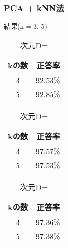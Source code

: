 \documentclass[dvipdfmx]{beamer}
\begin{document}
\begin{frame}
  \frametitle{PCA + kNN法}
  結果(k = 3, 5)
  \begin{table}
    \centering
    \begin{minipage}{0.3\columnwidth}
      \caption{次元D= }
      \centering
      \begin{tabular}{c r } \toprule
      kの数 & 正答率  \\ \midrule
      3 & 92.53\% \\
      5 & 92.85\% \\ \bottomrule
      \end{tabular}
    \end{minipage}
    \begin{minipage}{0.3\columnwidth}
      \caption{次元D= }
      \centering
      \begin{tabular}{c r } \toprule
      kの数 & 正答率  \\ \midrule
      3 & 97.57\% \\
      5 & 97.53\% \\ \bottomrule
      \end{tabular}
    \end{minipage}
    \begin{minipage}{0.3\columnwidth}
      \caption{次元D= }
      \centering
      \begin{tabular}{c r } \toprule
      kの数 & 正答率  \\ \midrule
      3 & 97.36\% \\
      5 & 97.38\% \\ \bottomrule
      \end{tabular}
    \end{minipage}
  \end{table}

\end{frame}
\end{document}
